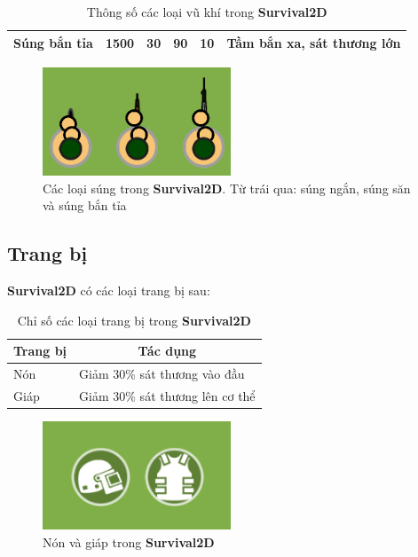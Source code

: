 \documentclass[12pt,a4paper]{article}
\begin{document}
\begin{table}[H]
\begin{tabular}{|l|c|c|c|c|l|}
Súng bắn tỉa                          & 1500                                                       & 30                                                                       & 90                                                                    & 10                                                          & Tầm bắn xa, sát thương lớn                                                                      \\ \hline
\end{tabular}
\caption{Thông số các loại vũ khí trong \textbf{Survival2D}}
\end{table}

   \begin{figure}[H]
      \centering
      \includegraphics[width=0.5\textwidth]{Img/game_screen_shoot/player_gun.png}
      \caption{Các loại súng trong \textbf{Survival2D}. Từ trái qua: súng ngắn, súng săn và súng bắn tỉa}
  \end{figure}

  \subsection{Trang bị}
  \textbf{Survival2D} có các loại trang bị sau:
\begin{table}[H]
\centering
\begin{tabular}{|l|l|}
\hline
\multicolumn{1}{|c|}{\textbf{Trang bị}} & \multicolumn{1}{c|}{\textbf{Tác dụng}} \\ \hline
Nón & Giảm 30\% sát thương vào đầu \\ \hline
Giáp & Giảm 30\% sát thương lên cơ thể \\ \hline
\end{tabular}
\caption{Chỉ số các loại trang bị trong \textbf{Survival2D}}
\end{table}
  \begin{figure}[H]
      \centering
      \includegraphics[width=0.5\textwidth]{Img/game_screen_shoot/trang_bi.png}
      \caption{Nón và giáp trong \textbf{Survival2D}}
  \end{figure}
  
\end{document}
